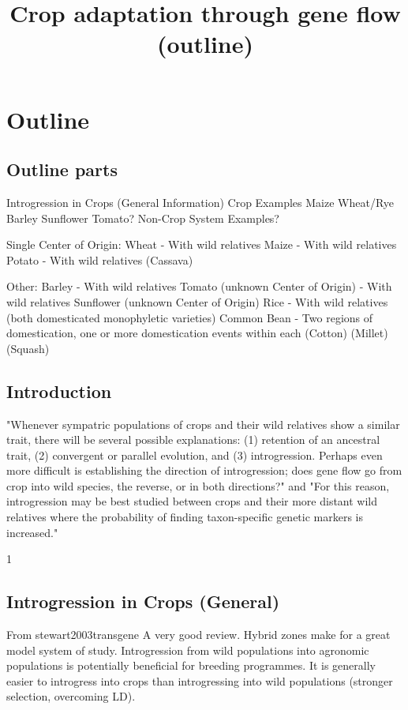 \documentclass[11pt]{article}
\title{Crop adaptation through gene flow (outline)}
\begin{document}
\maketitle

\section*{Outline}
\subsection*{Outline parts}
Introgression in Crops (General Information)
Crop Examples
    Maize
    Wheat/Rye
    Barley
    Sunflower
    Tomato?
Non-Crop System Examples?

Single Center of Origin:
Wheat - With wild relatives
Maize - With wild relatives
Potato - With wild relatives
(Cassava)

Other:
Barley - With wild relatives
Tomato (unknown Center of Origin) - With wild relatives
Sunflower (unknown Center of Origin)
Rice - With wild relatives (both domesticated monophyletic varieties)
Common Bean - Two regions of domestication, one or more domestication events within each
(Cotton)
(Millet)
(Squash)

\subsection*{Introduction}
 "Whenever sympatric populations of crops and their wild relatives show a similar trait, there will be several possible explanations: (1) retention of an ancestral trait, (2) convergent or parallel evolution, and (3) introgression.  Perhaps even more difficult is establishing the direction of introgression; does gene flow go from crop into wild species, the reverse, or in both directions?" and "For this reason, introgression may be best studied between crops and their more distant wild relatives where the probability of finding taxon-specific genetic markers is increased." \cite{doebley1990molecular}


1\subsection*{Introgression in Crops (General)}

From {stewart2003transgene}
A very good review.
Hybrid zones make for a great model system of study.
Introgression from wild populations into agronomic populations is potentially beneficial for breeding programmes.
It is generally easier to introgress into crops than introgressing into wild populations (stronger selection, overcoming LD).
\end{document}
